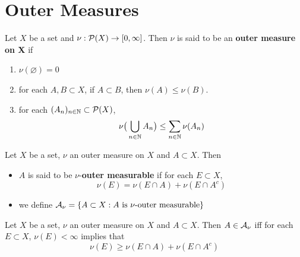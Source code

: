 \documentclass{book}
\begin{document}
	
	
	
	
	
	
	
	
	
	
	
	
	
	
	\newpage
	\section{Outer Measures}
	
	\begin{defn}  
		Let $X$ be a set and $\nu : \mathcal{P}(X) \rightarrow [0, \infty]$. Then $\nu$ is said to be an \textbf{outer measure on X} if 
		\begin{enumerate}
			\item $\nu(\varnothing) = 0$
			\item for each $A,B \subset X $, if $A \subset B$, then $\nu(A) \leq \nu(B)$.
			\item for each $(A_n)_{n \in \mathbb{N}} \subset \mathcal{P}(X)$, $$\nu\big(\bigcup\limits_{n \in \mathbb{N}} A_n\big) \leq \sum\limits_{n \in \mathbb{N}}\nu(A_n) $$
		\end{enumerate}
	\end{defn}
	
	\begin{defn}  
		Let $X$ be a set, $\nu$ an outer measure on $X$ and $A \subset X$. Then 
		\begin{itemize}
			\item $A$ is said to be $\nu$-\textbf{outer measurable} if for each $E \subset X$, 
			\begin{equation*}
				\nu(E) = \nu(E \cap A) + \nu(E \cap A^c)
			\end{equation*}
			\item we define $\mathcal{A}_{\nu} = \{A \subset X: A \text{ is }\nu \text{-outer measurable}\}$
		\end{itemize}
	\end{defn}
	
	\begin{ex}  
	Let $X$ be a set, $\nu$ an outer measure on $X$ and $A \subset X$. Then $A \in \mathcal{A}_{\nu}$ iff for each $E \subset X$, $\nu(E) < \infty$ implies that 
	\begin{equation*}
	\nu(E) \geq \nu(E \cap A) + \nu(E \cap A^c)
	\end{equation*}
	\end{ex}	
	
\end{document}
